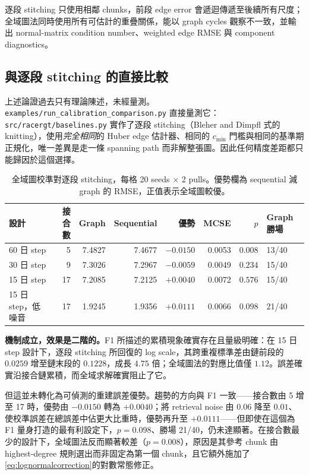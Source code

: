 \documentclass[12pt,a4paper,oneside]{article}
\begin{document}
逐段 stitching 只使用相鄰 chunks，前段 edge error 會遞迴傳遞至後續所有尺度；全域圖法同時使用所有可估計的重疊關係，能以 graph cycles 觀察不一致，並輸出 normal-matrix condition number、weighted edge RMSE 與 component diagnostics。

\subsection{與逐段 stitching 的直接比較}
\label{sec:calexp}

上述論證過去只有理論陳述，未經量測。\texttt{examples/run\_calibration\_comparison.py} 直接量測它：\texttt{src/racergt/baselines.py} 實作了逐段 stitching（Bleher and Dimpfl 式的 knitting），使用\emph{完全相同}的 Huber edge 估計器、相同的 $c_{\min}$ 門檻與相同的基準期正規化，唯一差異是走一條 spanning path 而非解整張圖。因此任何精度差距都只能歸因於這個選擇。

\begin{table}[H]
\centering
\small
\caption{全域圖校準對逐段 stitching，每格 20 seeds $\times$ 2 pulls。優勢欄為 sequential 減 graph 的 RMSE，正值表示全域圖較優。}
\label{tab:calexp}
\begin{tabular}{lrrrrrrl}
\toprule
設計 & 接合數 & Graph & Sequential & 優勢 & MCSE & $p$ & Graph 勝場\\
\midrule
60 日 step & 5 & 7.4827 & 7.4677 & $-0.0150$ & 0.0053 & $0.008$ & 13/40\\
30 日 step & 9 & 7.3026 & 7.2967 & $-0.0059$ & 0.0049 & $0.234$ & 15/40\\
15 日 step & 17 & 7.2085 & 7.2125 & $+0.0040$ & 0.0072 & $0.576$ & 15/40\\
15 日 step，低噪音 & 17 & 1.9245 & 1.9356 & $+0.0111$ & 0.0066 & $0.098$ & 21/40\\
\bottomrule
\end{tabular}
\end{table}

\textbf{機制成立，效果是二階的。}F1 所描述的累積現象確實存在且量級明確：在 15 日 step 設計下，逐段 stitching 所回復的 log scale，其跨重複標準差由鏈前段的 $0.0259$ 增至鏈末段的 $0.1228$，成長 $4.75$ 倍；全域圖法的對應比值僅 $1.12$。誤差確實沿接合鏈累積，而全域求解確實阻止了它。

但這並未轉化為可偵測的重建誤差優勢。趨勢的方向與 F1 一致——接合數由 5 增至 17 時，優勢由 $-0.0150$ 轉為 $+0.0040$；將 retrieval noise 由 $0.06$ 降至 $0.01$、使校準誤差在總誤差中佔更大比重時，優勢再升至 $+0.0111$——但即使在這個為 F1 量身打造的最有利設定下，$p=0.098$、勝場 21/40，仍未達顯著。在接合數最少的設計下，全域圖法反而顯著較差（$p=0.008$），原因是其參考 chunk 由 highest-degree 規則選出而非固定為第一個 chunk，且它額外施加了\cref{eq:lognormalcorrection}的對數常態修正。
\end{document}
